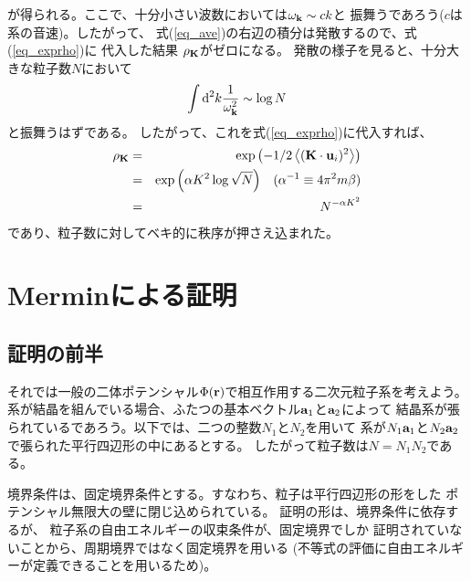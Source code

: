 \documentclass{jarticle}
\renewcommand{\v}[1]{{\bf #1}}
\newcommand{\ave}[1]{\left< #1 \right>}
\begin{document}
が得られる。ここで、十分小さい波数においては$\omega_{\v{k}} \sim ck$と
振舞うであろう($c$は系の音速)。したがって、
式(\ref{eq_ave})の右辺の積分は発散するので、式(\ref{eq_exprho})に
代入した結果 $\rho_{\v{K}}$がゼロになる。
発散の様子を見ると、十分大きな粒子数$N$において
\begin{equation}
  \int \mbox{d}^2 k \frac{1}{\omega_{\v{k}}^2} \sim \log{N}
\end{equation}
と振舞うはずである。
したがって、これを式(\ref{eq_exprho})に代入すれば、
\begin{eqnarray}
  \rho_{\v{K}} &=&  \exp{\left( -1/2 \ave{(\v{K} \cdot \v{u}_i )^2} \right)} \nonumber \\
  & = & \exp{\left( \alpha K^2 \log{\sqrt{N}}  \right)} \quad (\alpha^{-1} \equiv 4 \pi^2 m \beta) \nonumber \\
  &=& N^{- \alpha K^2}
\end{eqnarray}
であり、粒子数に対してベキ的に秩序が押さえ込まれた。

\section{Merminによる証明}

\subsection{証明の前半}

それでは一般の二体ポテンシャル$\Phi(\v{r})$で相互作用する二次元粒子系を考えよう。
系が結晶を組んでいる場合、ふたつの基本ベクトル$\v{a}_1$と$\v{a}_2$によって
結晶系が張られているであろう。以下では、二つの整数$N_1$と$N_2$を用いて
系が$N_1\v{a}_1$と$N_2\v{a}_2$で張られた平行四辺形の中にあるとする。
したがって粒子数は$N=N_1 N_2$である。

境界条件は、固定境界条件とする。すなわち、粒子は平行四辺形の形をした
ポテンシャル無限大の壁に閉じ込められている。
証明の形は、境界条件に依存するが、
粒子系の自由エネルギーの収束条件が、固定境界でしか
証明されていないことから、周期境界ではなく固定境界を用いる
(不等式の評価に自由エネルギーが定義できることを用いるため)。
\end{document}
